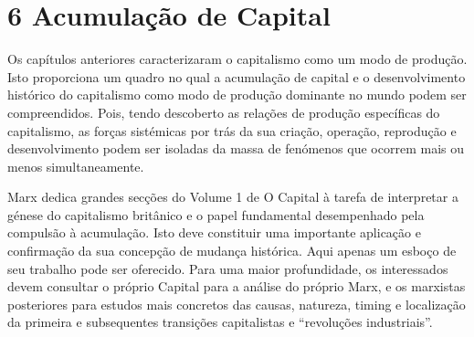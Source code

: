 \chapter{6 Acumulação de Capital}\label{6 Acumulação de Capital}
 \par 
Os capítulos anteriores caracterizaram o capitalismo como um modo de produção. Isto proporciona um quadro no qual a acumulação de capital e o desenvolvimento histórico do capitalismo como modo de produção dominante no mundo podem ser compreendidos. Pois, tendo descoberto as relações de produção específicas do capitalismo, as forças sistémicas por trás da sua criação, operação, reprodução e desenvolvimento podem ser isoladas da massa de fenómenos que ocorrem mais ou menos simultaneamente.
 \par 
Marx dedica grandes secções do Volume {\color{blue}1} de O Capital à tarefa de interpretar a génese do capitalismo britânico e o papel fundamental desempenhado pela compulsão à acumulação. Isto deve constituir uma importante aplicação e confirmação da sua concepção de mudança histórica. Aqui apenas um esboço de seu trabalho pode ser oferecido. Para uma maior profundidade, os interessados ​​devem consultar o próprio Capital para a análise do próprio Marx, e os marxistas posteriores para estudos mais concretos das causas, natureza, timing e localização da primeira e subsequentes transições capitalistas e “revoluções industriais”.
 \par 
